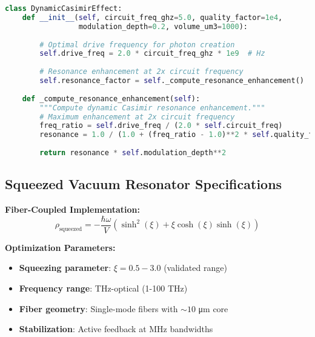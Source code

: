 \documentclass[11pt]{article}
\begin{document}
\begin{lstlisting}[language=Python]
class DynamicCasimirEffect:
    def __init__(self, circuit_freq_ghz=5.0, quality_factor=1e4,
                 modulation_depth=0.2, volume_um3=1000):
        
        # Optimal drive frequency for photon creation
        self.drive_freq = 2.0 * circuit_freq_ghz * 1e9  # Hz
        
        # Resonance enhancement at 2x circuit frequency
        self.resonance_factor = self._compute_resonance_enhancement()
        
    def _compute_resonance_enhancement(self):
        """Compute dynamic Casimir resonance enhancement."""
        # Maximum enhancement at 2x circuit frequency
        freq_ratio = self.drive_freq / (2.0 * self.circuit_freq)
        resonance = 1.0 / (1.0 + (freq_ratio - 1.0)**2 * self.quality_factor)
        
        return resonance * self.modulation_depth**2
\end{lstlisting}

\subsection{Squeezed Vacuum Resonator Specifications}

\textbf{Fiber-Coupled Implementation:}
\begin{equation}
\rho_{\text{squeezed}} = -\frac{\hbar \omega}{V} (\sinh^2(\xi) + \xi \cosh(\xi)\sinh(\xi))
\end{equation}

\textbf{Optimization Parameters:}
\begin{itemize}
    \item \textbf{Squeezing parameter}: $\xi = 0.5-3.0$ (validated range)
    \item \textbf{Frequency range}: THz-optical (1-100 THz)
    \item \textbf{Fiber geometry}: Single-mode fibers with $\sim 10$ μm core
    \item \textbf{Stabilization}: Active feedback at MHz bandwidths
\end{itemize}
\end{document}
